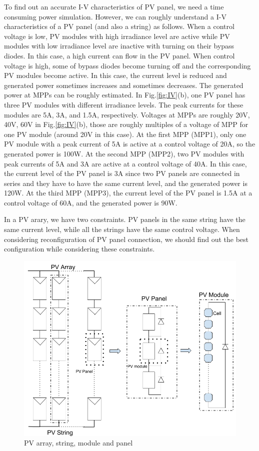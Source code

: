 \documentclass[conference]{IEEEtran}
\begin{document}
To find out an accurate I-V characteristics of PV panel, we need a time consuming power simulation. However, we can roughly understand a I-V characteristics of a PV panel (and also a string) as follows. When a control voltage is low, PV modules with high irradiance level are active while PV modules with low irradiance level are inactive with turning on their bypass diodes. In this case, a high current can flow in the PV panel. When control voltage is high, some of bypass diodes become turning off and the corresponding PV modules become active. In this case, the current level is reduced and generated power sometimes increases and sometimes decreases. The generated power at MPPs can be roughly estimated. In Fig.\ref{fig:IV}(b), one PV panel has three PV modules with different irradiance levels. The peak currents for these modules are 5A, 3A, and 1.5A, respectively. Voltages at MPPs are roughly 20V, 40V, 60V in Fig.\ref{fig:IV}(b), those are roughly multiples of a voltage of MPP for one PV module (around 20V in this case). At the first MPP (MPP1), only one PV module with a peak current of 5A is active at a control voltage of 20A, so the generated power is 100W. At the second MPP (MPP2), two PV modules with peak currents of 5A and 3A are active at a control voltage of 40A. In this case, the current level of the PV panel is 3A since two PV panels are connected in series and they have to have the same current level, and the generated power is 120W. At the third MPP (MPP3), the current level of the PV panel is 1.5A at a control voltage of 60A, and the generated power is 90W. 

In a PV arary, we have two constraints. PV panels in the same string have the same current level, while all the strings have the same control voltage. When considering reconfiguration of PV panel connection, we should find out the best configuration while considering these constraints. 

\begin{figure}[t]
    \centering
    \includegraphics[width=0.8\linewidth]{module.png}
    \caption{PV array, string, module and panel}
    \label{model}
\end{figure}
\end{document}
